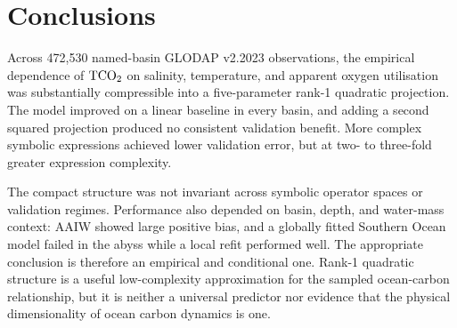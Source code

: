 \section{Conclusions}

Across 472,530 named-basin GLODAP v2.2023 observations, the empirical dependence of $\mathrm{TCO_2}$ on salinity, temperature, and apparent oxygen utilisation was substantially compressible into a five-parameter rank-1 quadratic projection. The model improved on a linear baseline in every basin, and adding a second squared projection produced no consistent validation benefit. More complex symbolic expressions achieved lower validation error, but at two- to three-fold greater expression complexity.

The compact structure was not invariant across symbolic operator spaces or validation regimes. Performance also depended on basin, depth, and water-mass context: AAIW showed large positive bias, and a globally fitted Southern Ocean model failed in the abyss while a local refit performed well. The appropriate conclusion is therefore an empirical and conditional one. Rank-1 quadratic structure is a useful low-complexity approximation for the sampled ocean-carbon relationship, but it is neither a universal predictor nor evidence that the physical dimensionality of ocean carbon dynamics is one.
